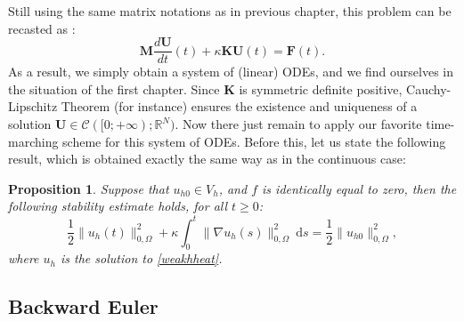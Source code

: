 \documentclass{article}
\newtheorem{proposition}{Proposition}
\begin{document}
Still using the same matrix notations as in previous chapter, this problem can be recasted as :
\begin{equation}
    \label{FEMmatrixHeat}
    \mathbf{M} \frac{d \mathbf{U}}{dt}(t) + \kappa \mathbf{K} \mathbf{U} (t) = \mathbf{F} (t).
\end{equation}
As a result, we simply obtain a system of (linear) ODEs, and we find ourselves in the situation of the first chapter.
Since $\mathbf{K}$ is symmetric definite positive, Cauchy-Lipschitz Theorem (for instance) ensures the existence and uniqueness of a solution $\mathbf{U} \in \mathcal{C}([0;+\infty);\mathbb{R}^N)$. Now there just remain to apply our favorite time-marching scheme for this system of ODEs. Before this, let us state the following result, which is obtained exactly the same way as in the continuous case:

\begin{proposition}
Suppose that $u_{h0} \in V_h$, and $f$ is identically equal to zero, then the following stability estimate holds, for all $t\geq0$:
\begin{equation}
    \label{stabHeath}
    \frac12 
    \| u_h(t) \|^2_{0,\Omega}
    + \kappa
    \int_0^t \| \nabla u_h(s) \|^2_{0,\Omega} \ \mathrm{d}s
    =
    \frac12 
    \| u_{h0} \|^2_{0,\Omega},
\end{equation}
where $u_h$ is the solution to \eqref{weakhheat}.
\end{proposition}

\subsection{Backward Euler}
\end{document}
